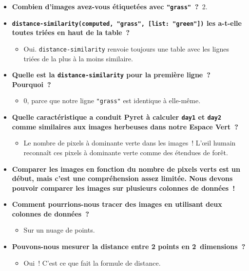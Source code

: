 \documentclass[12pt,a4paper]{article}
\begin{document}
\begin{thinkbox}
  \begin{itemize}
    \item \textbf{Combien d'images avez-vous étiquetées avec \texttt{"grass"}~?}~2.
    \item \textbf{\texttt{distance-similarity(computed, "grass", [list: "green"])} les a-t-elle toutes triées en haut de la table~?}
    \begin{itemize}
      \item Oui. \texttt{distance-similarity} renvoie toujours une table avec les lignes triées de la plus à la moins similaire.
    \end{itemize}
    \item \textbf{Quelle est la \texttt{distance-similarity} pour la première ligne~? Pourquoi~?}
    \begin{itemize}
      \item 0, parce que notre ligne \texttt{"grass"} est identique à elle-même.
    \end{itemize}
    \item \textbf{Quelle caractéristique a conduit Pyret à calculer \texttt{day1} et \texttt{day2} comme similaires aux images herbeuses dans notre Espace Vert~?}
    \begin{itemize}
      \item Le nombre de pixels à dominante verte dans les images~! L'œil humain reconnaît ces pixels à dominante verte comme des étendues de forêt.
    \end{itemize}
  \end{itemize}
\end{thinkbox}

\begin{thinkbox}
  \begin{itemize}
    \item \textbf{Comparer les images en fonction du nombre de pixels verts est un début, mais c'est une compréhension assez limitée. Nous devons pouvoir comparer les images sur plusieurs colonnes de données~!}
    \item \textbf{Comment pourrions-nous tracer des images en utilisant deux colonnes de données~?}
    \begin{itemize}
      \item Sur un nuage de points.
    \end{itemize}
    \item \textbf{Pouvons-nous mesurer la distance entre 2 points en 2~dimensions~?}
    \begin{itemize}
      \item Oui~! C'est ce que fait la formule de distance.
    \end{itemize}
  \end{itemize}
\end{thinkbox}
\end{document}
